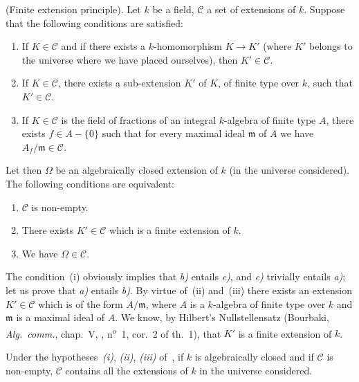 \begin{proposition}[9.1.1]
\label{IV.9.1.1}
\textnormal{(Finite extension principle).}
Let $k$ be a field, $\mathcal{C}$ a set of extensions of $k$.
Suppose that the following conditions are satisfied:
\begin{enumerate}[label=(\roman*)]
  \item If $K\in\mathcal{C}$ and if there exists a $k$-homomorphism $K\to K'$ (where $K'$ belongs to the universe where we have placed ourselves), then $K'\in\mathcal{C}$.
  \item If $K\in\mathcal{C}$, there exists a sub-extension $K'$ of $K$, of finite type over $k$, such that $K'\in\mathcal{C}$.
  \item If $K\in\mathcal{C}$ is the field of fractions of an integral $k$-algebra of finite type $A$, there exists $f\in A-\{0\}$ such that for every maximal ideal $\mathfrak{m}$ of $A$ we have $A_f/\mathfrak{m}\in\mathcal{C}$.
\end{enumerate}

Let then $\Omega$ be an algebraically closed extension of $k$ (in the universe considered).
The following conditions are equivalent:
\begin{enumerate}[label=\emph{\alph*)}]
  \item $\mathcal{C}$ is non-empty.
  \item There exists $K'\in\mathcal{C}$ which is a finite extension of $k$.
  \item We have $\Omega\in\mathcal{C}$.
\end{enumerate}
\end{proposition}

The condition~(i) obviously implies that \emph{b)} entails \emph{c)}, and \emph{c)} trivially entails \emph{a)};
let us prove that \emph{a)} entails \emph{b)}.
By virtue of~(ii) and~(iii) there exists an extension $K'\in\mathcal{C}$ which is of the form $A/\mathfrak{m}$, where $A$ is a $k$-algebra of finite type over $k$ and $\mathfrak{m}$ is a maximal ideal of $A$.
We know, by Hilbert's Nullstellensatz (Bourbaki, \emph{Alg.\ comm.}, chap.~V, , n\textsuperscript{o}~1, cor.~2 of th.~1), that $K'$ is a finite extension of $k$.


\begin{corollary}[9.1.2]
\label{IV.9.1.2}
Under the hypotheses~\emph{(i)}, \emph{(ii)}, \emph{(iii)} of~, if $k$ is algebraically closed and if $\mathcal{C}$ is non-empty, $\mathcal{C}$ contains all the extensions of $k$ in the universe considered.
\end{corollary}

